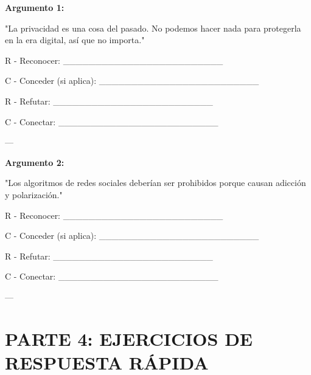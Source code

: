 \documentclass[a4paper,11pt]{article}
\begin{document}
\textbf{Argumento 1:}

"La privacidad es una cosa del pasado. No podemos hacer nada para protegerla en la era digital, así que no importa."

\vspace{0.2cm}

R - Reconocer: _________________________

\vspace{0.2cm}

C - Conceder (si aplica): _________________________

\vspace{0.2cm}

R - Refutar: _________________________

\vspace{0.2cm}

C - Conectar: _________________________

\vspace{0.2cm}

---

\vspace{0.2cm}

\textbf{Argumento 2:}

"Los algoritmos de redes sociales deberían ser prohibidos porque causan adicción y polarización."

\vspace{0.2cm}

R - Reconocer: _________________________

\vspace{0.2cm}

C - Conceder (si aplica): _________________________

\vspace{0.2cm}

R - Refutar: _________________________

\vspace{0.2cm}

C - Conectar: _________________________

\vspace{0.2cm}

---

\vspace{0.2cm}

\section{PARTE 4: EJERCICIOS DE RESPUESTA RÁPIDA}

\vspace{0.2cm}
\end{document}

